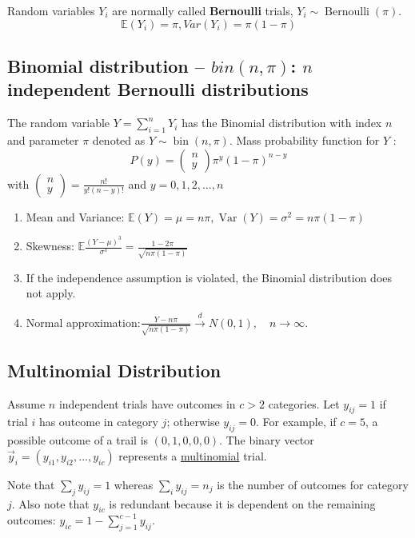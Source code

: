 \documentclass[11pt]{elegantbook}
\begin{document}
Random variables $Y_{i}$ are normally called \textbf{Bernoulli} trials, $Y_{i} \sim \operatorname{Bernoulli}(\pi)$. $$\mathbb{E}(Y_i)=\pi,Var(Y_i)=\pi(1-\pi)$$

\subsection{Binomial distribution -- $bin(n,\pi)$: $n$ independent Bernoulli distributions}
The random variable $Y=\sum_{i=1}^{n} Y_{i}$ has the Binomial distribution with index $n$ and parameter $\pi$ denoted as $Y \sim \operatorname{bin}(n, \pi)$.
Mass probability function for $Y$ :
$$
P(y)=\left(\begin{array}{l}
n \\
y
\end{array}\right) \pi^{y}(1-\pi)^{n-y}
$$
with $\left(\begin{array}{l}n \\ y\end{array}\right)=\frac{n !}{y !(n-y) !}$ and $y=0,1,2, \ldots, n$
\begin{enumerate}[(1)]
    \item Mean and Variance:
    $\mathbb{E}(Y)=\mu=n \pi,\operatorname{Var}(Y)=\sigma^{2}=n \pi(1-\pi)$
    \item Skewness: $\mathbb{E}\frac{(Y-\mu)^{3}}{\sigma^{3}}=\frac{1-2 \pi}{\sqrt{n \pi(1-\pi)}}$
    \item If the independence assumption is violated, the Binomial distribution does not apply.
    \item Normal approximation:$\frac{Y-n \pi}{\sqrt{n \pi(1-\pi)}} \stackrel{d}{\longrightarrow} N(0,1),\quad {n \rightarrow \infty}$.
\end{enumerate}

\subsection{Multinomial Distribution}
Assume $n$ independent trials have outcomes in $c > 2$ categories. Let $y_{ij} = 1$ if trial $i$ has outcome in category $j$; otherwise $y_{ij} = 0$. For example, if $c = 5$, a possible outcome of a trail is $(0, 1, 0, 0, 0)$. The binary vector $\vec{y}_i = (y_{i1}, y_{i2}, . . . , y_{ic})$ represents a \underline{multinomial} trial.

Note that $\sum_{j}y_{ij}=1$ whereas $\sum_{i}y_{ij}=n_j$ is the number of outcomes for category $j$. Also note that $y_{ic}$ is redundant because it is dependent on the remaining outcomes: $y_{ic} = 1 - \sum_{j=1}^{c-1} y_{ij}$.
\end{document}

